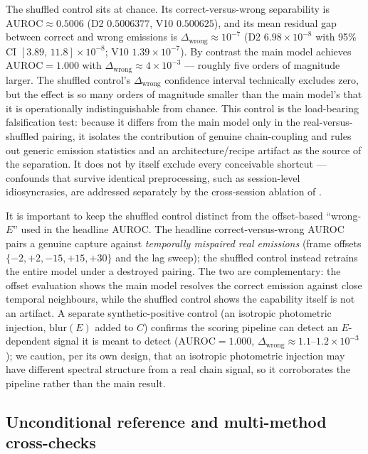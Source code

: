 The shuffled control sits at chance. Its correct-versus-wrong separability is $\mathrm{AUROC}\approx 0.5006$ (D2 $0.5006377$, V10 $0.500625$), and its mean residual gap between correct and wrong emissions is $\Delta_{\text{wrong}}\approx 10^{-7}$ (D2 $6.98\times10^{-8}$ with 95\% CI $[3.89,\,11.8]\times10^{-8}$; V10 $1.39\times10^{-7}$). By contrast the main model achieves $\mathrm{AUROC}=1.000$ with $\Delta_{\text{wrong}}\approx 4\times10^{-3}$ --- roughly five orders of magnitude larger. The shuffled control's $\Delta_{\text{wrong}}$ confidence interval technically excludes zero, but the effect is so many orders of magnitude smaller than the main model's that it is operationally indistinguishable from chance. This control is the load-bearing falsification test: because it differs from the main model only in the real-versus-shuffled pairing, it isolates the contribution of genuine chain-coupling and rules out generic emission statistics and an architecture/recipe artifact as the source of the separation. It does not by itself exclude every conceivable shortcut --- confounds that survive identical preprocessing, such as session-level idiosyncrasies, are addressed separately by the cross-session ablation of .

It is important to keep the shuffled control distinct from the offset-based ``wrong-$E$'' used in the headline AUROC. The headline correct-versus-wrong AUROC pairs a genuine capture against \emph{temporally mispaired real emissions} (frame offsets $\{-2,+2,-15,+15,+30\}$ and the lag sweep); the shuffled control instead retrains the entire model under a destroyed pairing. The two are complementary: the offset evaluation shows the main model resolves the correct emission against close temporal neighbours, while the shuffled control shows the capability itself is not an artifact. A separate synthetic-positive control (an isotropic photometric injection, $\mathrm{blur}(E)$ added to $C$) confirms the scoring pipeline can detect an $E$-dependent signal it is meant to detect ($\mathrm{AUROC}=1.000$, $\Delta_{\text{wrong}}\approx 1.1$--$1.2\times10^{-3}$); we caution, per its own design, that an isotropic photometric injection may have different spectral structure from a real chain signal, so it corroborates the pipeline rather than the main result.

\subsection{Unconditional reference and multi-method cross-checks}

